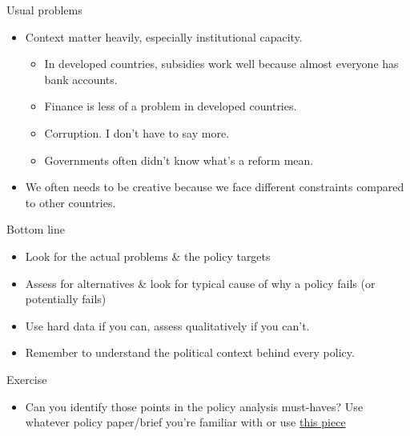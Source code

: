\documentclass[
  ignorenonframetext,
]{beamer}
\providecommand{\tightlist}{%
  \setlength{\itemsep}{0pt}\setlength{\parskip}{0pt}}\usepackage{longtable,booktabs,array}
\begin{document}
\begin{frame}{Usual problems}
\protect\hypertarget{usual-problems-3}{}
\begin{itemize}
\item
  Context matter heavily, especially institutional capacity.

  \begin{itemize}
  \item
    In developed countries, subsidies work well because almost everyone
    has bank accounts.
  \item
    Finance is less of a problem in developed countries.
  \item
    Corruption. I don't have to say more.
  \item
    Governments often didn't know what's a reform mean.
  \end{itemize}
\item
  We often needs to be creative because we face different constraints
  compared to other countries.
\end{itemize}
\end{frame}

\begin{frame}{Bottom line}
\protect\hypertarget{bottom-line}{}
\begin{itemize}
\item
  Look for the actual problems \& the policy targets
\item
  Assess for alternatives \& look for typical cause of why a policy
  fails (or potentially fails)
\item
  Use hard data if you can, assess qualitatively if you can't.
\item
  Remember to understand the political context behind every policy.
\end{itemize}
\end{frame}

\begin{frame}{Exercise}
\protect\hypertarget{exercise}{}
\begin{itemize}
\tightlist
\item
  Can you identify those points in the policy analysis must-haves? Use
  whatever policy paper/brief you're familiar with or use
  \href{https://c95e5d29-0df6-4d6f-8801-1d6926c32107.usrfiles.com/ugd/c95e5d_7735b11428c94102a3ff186b55058b2a.pdf}{this
  piece}
\end{itemize}
\end{frame}
\end{document}
